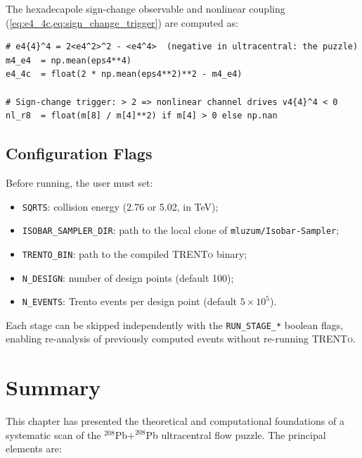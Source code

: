 \documentclass[12pt,a4paper,twoside]{report}
\newcommand{\trento}{\textsc{TRENTo}\xspace}
\newcommand{\PbPb}{$^{208}$Pb$+^{208}$Pb\xspace}
\begin{document}
The hexadecapole sign-change observable and nonlinear coupling
(\cref{eq:e4_4c,eq:sign_change_trigger}) are computed as:

\begin{lstlisting}[caption={Hexadecapole cumulant and sign-change trigger.},
  label=lst:puzzle_obs]
# e4{4}^4 = 2<e4^2>^2 - <e4^4>  (negative in ultracentral: the puzzle)
m4_e4  = np.mean(eps4**4)
e4_4c  = float(2 * np.mean(eps4**2)**2 - m4_e4)

# Sign-change trigger: > 2 => nonlinear channel drives v4{4}^4 < 0
nl_r8  = float(m[8] / m[4]**2) if m[4] > 0 else np.nan
\end{lstlisting}

\subsection{Configuration Flags}
\label{subsec:config_flags}

Before running, the user must set:
\begin{itemize}[leftmargin=*]
  \item \texttt{SQRTS}: collision energy (2.76 or 5.02, in TeV);
  \item \texttt{ISOBAR\_SAMPLER\_DIR}: path to the local clone of
        \texttt{mluzum/Isobar-Sampler};
  \item \texttt{TRENTO\_BIN}: path to the compiled \trento binary;
  \item \texttt{N\_DESIGN}: number of design points (default 100);
  \item \texttt{N\_EVENTS}: Trento events per design point
        (default $5\times 10^5$).
\end{itemize}
Each stage can be skipped independently with the
\texttt{RUN\_STAGE\_*} boolean flags, enabling re-analysis of
previously computed events without re-running \trento.

\section{Summary}
\label{sec:summary}

This chapter has presented the theoretical and computational
foundations of a systematic scan of the \PbPb ultracentral flow
puzzle.  The principal elements are:
\end{document}
